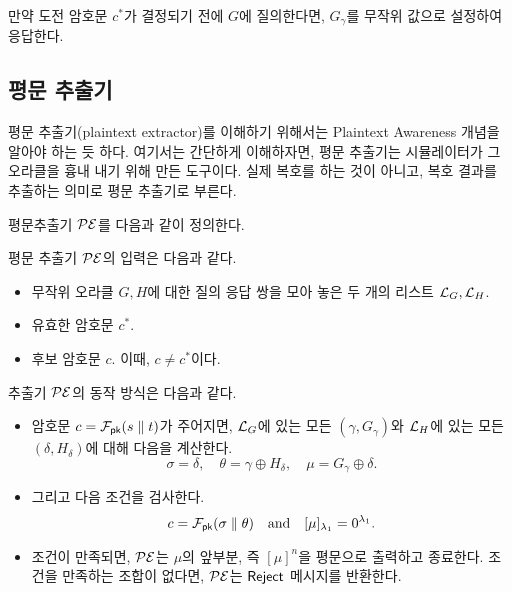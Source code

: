 \begin{memo}
	만약 도전 암호문 $c^*$가 결정되기 전에 $G$에 질의한다면, $G_{\gamma}$를
	무작위 값으로 설정하여 응답한다.
\end{memo}

\subsection{평문 추출기}

\begin{memo}
	평문 추출기(plaintext extractor)를 이해하기 위해서는 Plaintext Awareness
	개념을 알아야 하는 듯 하다. 여기서는 간단하게 이해하자면, 평문 추출기는
	시뮬레이터가 그 오라클을 흉내 내기 위해 만든 도구이다. 실제 복호를 하는 것이
	아니고, 복호 결과를 추출하는 의미로 평문 추출기로 부른다.
\end{memo}

평문추출기 $\mathcal{PE}$를 다음과 같이 정의한다.

\begin{tcolorbox}
	평문 추출기 $\mathcal{PE}$의 입력은 다음과 같다.
	\begin{itemize}
		\item 무작위 오라클 $G, H$에 대한 질의 응답 쌍을 모아 놓은 두 개의
		리스트 $\mathcal{L}_{G}, \mathcal{L}_{H}$.
		\item 유효한 암호문 $c^*$.
		\item 후보 암호문 $c$. 이때, $c \ne c^*$이다.
	\end{itemize}
	추출기 $\mathcal{PE}$의 동작 방식은 다음과 같다.
	\begin{itemize}
		\item 암호문 $c = \mathcal{F}_{\textsf{pk}}(s \parallel t)$가 주어지면, $\mathcal{L}_{G}$에 있는 모든
		$(\gamma, G_\gamma)$와 $\mathcal{L}_{H}$에 있는 모든 $(\delta, H_\delta)$에 대해
		다음을 계산한다. 
		$$
		\sigma = \delta,\quad \theta = \gamma \oplus H_\delta,\quad \mu = G_\gamma \oplus \delta.
		$$
		\item 그리고 다음 조건을 검사한다.
		$$
			c = \mathcal{F}_{\textsf{pk}}(\sigma \parallel \theta) \quad \text{and} \quad [\mu]_{\lambda_1} = 0^{\lambda_1}.
		$$
		\item 조건이 만족되면, $\mathcal{PE}$는 $\mu$의 앞부분, 즉 $[\mu]^n$을 평문으로
		출력하고 종료한다. 조건을 만족하는 조합이 없다면, $\mathcal{PE}$는 $\textsf{Reject}$
		메시지를 반환한다.
	\end{itemize}
\end{tcolorbox}


